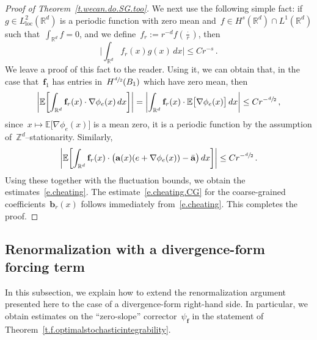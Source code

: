 \documentclass[11pt]{article} %
\numberwithin{equation}{section}
\theoremstyle{definition}
\newcommand*{\Zd}{\ensuremath{\mathbb{Z}^d}}
\newcommand*{\Rd}{\ensuremath{\mathbb{R}^d}}
\renewcommand{\b}{\ensuremath{\mathbf{b}}}
\newcommand{\f}{\mathbf{f}}
\renewcommand{\a}{\mathbf{a}}
\newcommand{\ahom}{\bar{\a}}
\newcommand{\E}{\mathbb{E}}
\begin{document}
\begin{proof}[{Proof of Theorem~\ref{t.wecan.do.SG.too}}]
We next use the following simple fact: if~$g \in L^2_{\mathrm{loc}}(\Rd)$ is a periodic function with zero mean and~$f \in H^{s}(\Rd)\cap L^1(\Rd)$ such that~$\int_{\Rd} f = 0$, and we define~$f_r:= r^{-d} f(\frac\cdot r)$, then 
\begin{equation*}
\biggl| \int_{\Rd} f_r(x) g(x)\,dx \biggr| \leq Cr^{-s}\,.
\end{equation*}
We leave a proof of this fact to the reader. 
Using it, we can obtain that, in the case that~$\f_1$ has entries in~$H^{\sfrac d2}(B_1)$ which have zero mean, then 
\begin{equation*}
\biggl| \E \biggl[ \int_{\Rd} \f_r(x)\cdot \nabla \phi_e(x)\,dx \biggr] \biggr| 
=
\biggl|  \int_{\Rd} \f_r(x)\cdot \E \bigl[\nabla \phi_e(x)\bigr] \,dx  \biggr| 
\leq Cr^{-\sfrac d2}\,,
\end{equation*}
since~$x\mapsto \E \bigl[ \nabla \phi_e(x) \bigr]$ is a mean zero, it is a periodic function by the assumption of~$\Zd$--stationarity. 
Similarly, 
\begin{equation*}
\biggl| \E \biggl[ \int_{\Rd} \f_r(x)\cdot \bigl( \a(x)(e+ \nabla \phi_e(x)) -\ahom\bigr) \,dx \biggr] \biggr| 
\leq 
Cr^{-\sfrac d2}\,.
\end{equation*}
Using these together with the fluctuation bounds, we obtain the estimates~\eqref{e.cheating}. The estimate~\eqref{e.cheating.CG} for the coarse-grained coefficients~$\b_r(x)$ follows immediately from~\eqref{e.cheating}. 
This completes the proof. 
\end{proof}


\subsection{Renormalization with a divergence-form forcing term}
\label{ss.rhs.optimal}

In this subsection, we explain how to extend the renormalization argument presented here to the case of a divergence-form right-hand side. In particular, we obtain estimates on the ``zero-slope'' corrector~$\psi_\f$ in the statement of Theorem~\ref{t.f.optimalstochasticintegrability}. 

\smallskip
\end{document}
